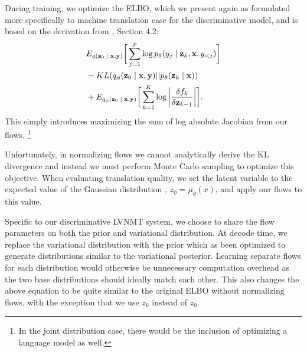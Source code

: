 During training, we optimize the \ac{ELBO}, which we present again as formulated more specifically to machine translation case for the discriminative model, and is based on the derivation from \citet{rezende2015VIwithNF}, Section 4.2:
\begin{align}
\begin{split}\label{eq:2}
&
E_{q(\textbf{z}_{0}\; | \;{\textbf{x}, \textbf{y}})} \bigg[ \sum_{j=1}^{p} \log p_{\theta}(y_{j} \; | \;{\textbf{z}_{k}}, \textbf{x}, y_{<j}) \bigg] \\
& - KL(q_{\phi}(\textbf{z}_{0} \; | \;{\textbf{x}, \textbf{y}}) || p_{\theta}(\textbf{z}_{k} \; | \;{\textbf{x}})) \\
&   +  E_{q_{\phi}(\textbf{z}_{0} \; | \;{\textbf{x}, \textbf{y}})} \bigg[\sum_{k=1}^{K} \log \bigg|\frac{\delta f_{k}}{\delta \textbf{z}_{k-1}} \bigg| \bigg].
\end{split}
\end{align}
This simply introduces maximizing the sum of  log absolute Jacobian from our flows. \footnote{In the joint distribution case, there would be the inclusion of optimizing a language model as well.}

Unfortunately, in normalizing flows we cannot analytically derive the KL divergence and instead we must perform Monte Carlo sampling to optimize this objective. When evaluating translation quality, we set the latent variable to the expected value of the Gaussian distribution , $z_{0} = \mu_{\theta}(x)$, and apply our flows to this value.

Specific to our discriminative \ac{LVNMT} system, we choose to share the flow parameters on both the prior and variational distribution. At decode time, we replace the variational distribution with the prior which as been optimized to generate distributions similar to the variational posterior. Learning separate flows for each distribution would otherwise be unnecessary computation overhead as the two base distributions should ideally match each other. This also changes the above equation to be quite similar to the original \ac{ELBO} without normalizing flows, with the exception that we use $z_{k}$ instead of $z_{0}$.








